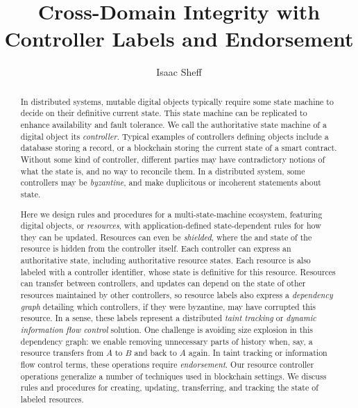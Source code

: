 \documentclass[a4paper,USenglish,cleveref, autoref, thm-restate, anonymous]{lipics-v2021}
\title{Cross-Domain Integrity with Controller Labels and Endorsement}%
\author{Isaac Sheff}{Heliax, Buffalo, USA \and \url{https://isaacsheff.com} }{isaac@heliax.dev}{https://orcid.org/0000-0002-1825-0097}{[(Optional) author-specific funding acknowledgements]}%
\begin{document}
\maketitle

\begin{abstract}
In distributed systems, mutable digital objects typically require some state machine to decide on their definitive current state.
This state machine can be replicated to enhance availability and fault tolerance.
We call the authoritative state machine of a digital object its \emph{controller}.
Typical examples of controllers defining objects include a database storing a record, or a blockchain storing the current state of a smart contract.
Without some kind of controller, different parties may have contradictory notions of what the state is, and no way to reconcile them.
In a distributed system, some controllers may be \emph{byzantine}, and make duplicitous or incoherent statements about state. 

Here we design rules and procedures for a multi-state-machine ecosystem, featuring digital objects, or \emph{resources}, with application-defined state-dependent rules for how they can be updated. 
Resources can even be \emph{shielded}, where the and state of the resource is hidden from the controller itself. 
Each controller can express an authoritative state, including authoritative resource states. 
Each resource is also labeled with a controller identifier, whose state is definitive for this resource. 
Resources can transfer between controllers, and updates can depend on the state of other resources maintained by other controllers, so resource labels also express a \emph{dependency graph} detailing which controllers, if they were byzantine, may have corrupted this resource.
In a sense, these labels represent a distributed \emph{taint tracking} or \emph{dynamic information flow control} solution.
One challenge is avoiding size explosion in this dependency graph: we enable removing unnecessary parts of history when, say, a resource transfers from $A$ to $B$ and back to $A$ again.
In taint tracking or information flow control terms, these operations require \emph{endorsement}.
Our resource controller operations generalize a number of techniques used in blockchain settings.
We discuss rules and procedures for creating, updating, transferring, and tracking the state of labeled resources.  
\end{abstract}
\end{document}
